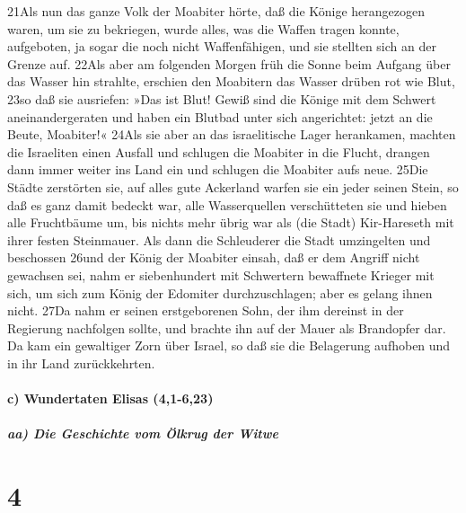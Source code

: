 21Als nun das ganze Volk der Moabiter hörte, daß die Könige herangezogen
waren, um sie zu bekriegen, wurde alles, was die Waffen tragen konnte,
aufgeboten, ja sogar die noch nicht Waffenfähigen, und sie stellten sich
an der Grenze auf. 22Als aber am folgenden Morgen früh die Sonne beim
Aufgang über das Wasser hin strahlte, erschien den Moabitern das Wasser
drüben rot wie Blut, 23so daß sie ausriefen: »Das ist Blut! Gewiß sind
die Könige mit dem Schwert aneinandergeraten und haben ein Blutbad unter
sich angerichtet: jetzt an die Beute, Moabiter!« 24Als sie aber an das
israelitische Lager herankamen, machten die Israeliten einen Ausfall und
schlugen die Moabiter in die Flucht, drangen dann immer weiter ins Land
ein und schlugen die Moabiter aufs neue. 25Die Städte zerstörten sie,
auf alles gute Ackerland warfen sie ein jeder seinen Stein, so daß es
ganz damit bedeckt war, alle Wasserquellen verschütteten sie und hieben
alle Fruchtbäume um, bis nichts mehr übrig war als (die Stadt)
Kir-Hareseth mit ihrer festen Steinmauer. Als dann die Schleuderer die
Stadt umzingelten und beschossen 26und der König der Moabiter einsah,
daß er dem Angriff nicht gewachsen sei, nahm er siebenhundert mit
Schwertern bewaffnete Krieger mit sich, um sich zum König der Edomiter
durchzuschlagen; aber es gelang ihnen nicht. 27Da nahm er seinen
erstgeborenen Sohn, der ihm dereinst in der Regierung nachfolgen sollte,
und brachte ihn auf der Mauer als Brandopfer dar. Da kam ein gewaltiger
Zorn über Israel, so daß sie die Belagerung aufhoben und in ihr Land
zurückkehrten.

\hypertarget{c-wundertaten-elisas-41-623}{%
\paragraph{c) Wundertaten Elisas
(4,1-6,23)}\label{c-wundertaten-elisas-41-623}}

\hypertarget{aa-die-geschichte-vom-uxf6lkrug-der-witwe}{%
\subparagraph{aa) Die Geschichte vom Ölkrug der
Witwe}\label{aa-die-geschichte-vom-uxf6lkrug-der-witwe}}

\hypertarget{section-3}{%
\section{4}\label{section-3}}

